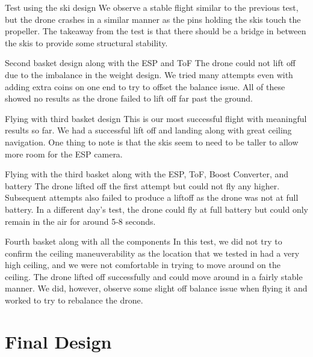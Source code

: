 \documentclass[12pt]{article}
\begin{document}
                 {Test using the ski design} {
                    We observe a stable flight similar to the previous test, but the drone crashes in a similar manner as the pins holding the skis touch the propeller.
                    The takeaway from the test is that there should be a bridge in between the skis to provide some structural stability.
                }

                 {Second basket design along with the ESP and ToF} {
                    The drone could not lift off due to the imbalance in the weight design.
                    We tried many attempts even with adding extra coins on one end to try to offset the balance issue.
                    All of these showed no results as the drone failed to lift off far past the ground.
                }

                 {Flying with third basket design} {
                    This is our most successful flight with meaningful results so far.
                    We had a successful lift off and landing along with great ceiling navigation.
                    One thing to note is that the skis seem to need to be taller to allow more room for the ESP camera.
                }

                 {Flying with the third basket along with the ESP, ToF, Boost Converter, and battery} {
                    The drone lifted off the first attempt but could not fly any higher.
                    Subsequent attempts also failed to produce a liftoff as the drone was not at full battery.
                    In a different day's test, the drone could fly at full battery but could only remain in the air for around 5-8 seconds.
                }

                 {Fourth basket along with all the components} {
                    In this test, we did not try to confirm the ceiling maneuverability as the location that we tested in had a very high ceiling, and we were not comfortable in trying to move around on the ceiling.
                    The drone lifted off successfully and could move around in a fairly stable manner.
                    We did, however, observe some slight off balance issue when flying it and worked to try to rebalance the drone.
                }
    
    \newpage
    \section{Final Design}
\end{document}
